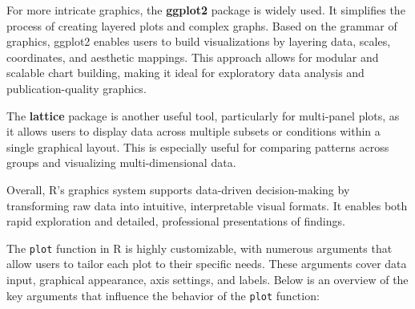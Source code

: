 \documentclass[10pt]{book}
\begin{document}
For more intricate graphics, the \textbf{ggplot2} package is widely used. It simplifies the process of creating layered plots and complex graphs. Based on the grammar of graphics, ggplot2 enables users to build visualizations by layering data, scales, coordinates, and aesthetic mappings. This approach allows for modular and scalable chart building, making it ideal for exploratory data analysis and publication-quality graphics.

The \textbf{lattice} package is another useful tool, particularly for multi-panel plots, as it allows users to display data across multiple subsets or conditions within a single graphical layout. This is especially useful for comparing patterns across groups and visualizing multi-dimensional data.

Overall, R's graphics system supports data-driven decision-making by transforming raw data into intuitive, interpretable visual formats. It enables both rapid exploration and detailed, professional presentations of findings.


The \texttt{plot} function in R is highly customizable, with numerous arguments that allow users to tailor each plot to their specific needs. These arguments cover data input, graphical appearance, axis settings, and labels. Below is an overview of the key arguments that influence the behavior of the \texttt{plot} function:
\end{document}
